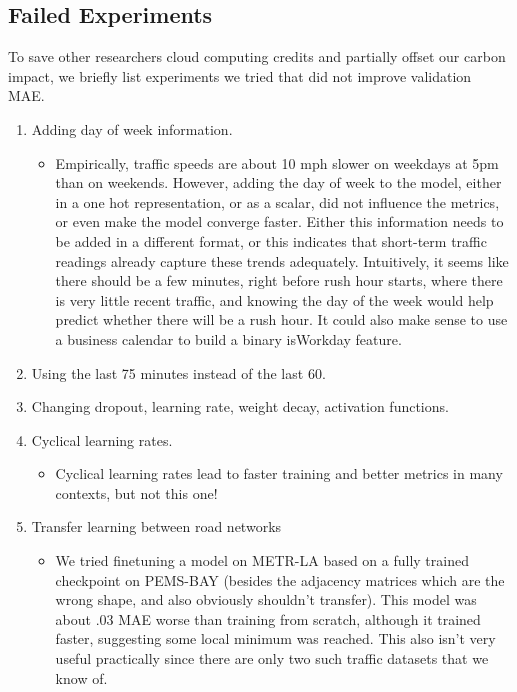 \documentclass[10pt]{article}
\begin{document}
\subsection{Failed Experiments}
To save other researchers cloud computing credits and partially offset our carbon impact, we briefly list experiments we tried that did not improve validation MAE. 

\begin{enumerate}
    \item Adding day of week information.
    \begin{itemize}
        \item Empirically, traffic speeds are about 10 mph slower on weekdays at 5pm than on weekends. However, adding the day of week to the model, either in a one hot representation, or as a scalar, did not influence the metrics, or even make the model converge faster. Either this information needs to be added in a different format, or this indicates that short-term traffic readings already capture these trends adequately. Intuitively, it seems like there should be a few minutes, right before rush hour starts, where there is very little recent traffic, and knowing the day of the week would help predict whether there will be a rush hour. It could also make sense to use a business calendar to build a binary isWorkday feature.
    \end{itemize}
    \item Using the last 75 minutes instead of the last 60.
    \item Changing dropout, learning rate, weight decay, activation functions.
    \item Cyclical learning rates.
    \begin{itemize}
        \item Cyclical learning rates \citep{Smith_2017} lead to faster training and better metrics in many contexts, but not this one!
    \end{itemize}
    \item Transfer learning between road networks
    \begin{itemize}
    \item We tried finetuning a model on METR-LA based on a fully trained checkpoint on PEMS-BAY (besides the adjacency matrices which are the wrong shape, and also obviously shouldn't transfer). This model was about .03 MAE worse than training from scratch, although it trained faster, suggesting some local minimum was reached. This also isn't very useful practically since there are only two such traffic datasets that we know of.

\end{itemize}
\end{enumerate}
\end{document}
